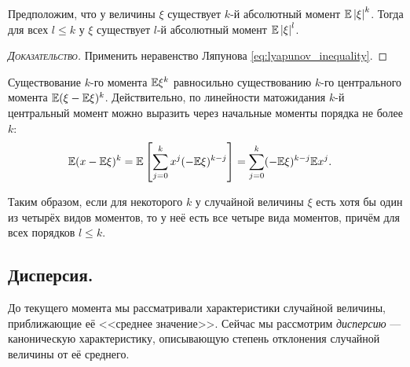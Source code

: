 \documentclass[../main.tex]{subfiles}
\begin{document}
\begin{remrk}
 \label{remark:high_moment_exists_then_low_moment_exists}
 Предположим, что у величины $ \xi $ существует $ k $-й абсолютный момент $ \mathbb E \left| \xi \right|^{k} $. Тогда для всех $ l \leqslant k $ у $ \xi $ существует $ l $-й абсолютный момент $ \mathbb E \left| \xi \right|^{l} $.
\end{remrk}
\begin{proof}[\normalfont\textsc{Доказательство}]
 Применить неравенство Ляпунова \eqref{eq:lyapunov_inequality}.
\end{proof}

\begin{remrk}
 Существование $ k $-го момента $ \mathbb E\xi^{k} $ равносильно существованию $ k $-го центрального момента $ \mathbb E(\xi-\mathbb E\xi)^{k} $. Действительно, по линейности матожидания $ k $-й центральный момент можно выразить через начальные моменты порядка не более $ k $:
 \begin{align*}
  \mathbb E(x-\mathbb E\xi)^{k} &= \mathbb E \left[ \sum_{j=0}^{k} x^{j}(-\mathbb E\xi)^{k-j} \right] = \sum_{j=0}^{k}(-\mathbb E\xi)^{k-j} \mathbb E x^{j}.
 \end{align*}
\end{remrk}

Таким образом, если для некоторого $ k $ у случайной величины $ \xi $ есть хотя бы один из четырёх видов моментов, то у неё есть все четыре вида моментов, причём для всех порядков $ l \leqslant k $.

\subsection{Дисперсия.}

До текущего момента мы рассматривали характеристики случайной величины, приближающие её <<среднее значение>>. Сейчас мы рассмотрим \textit{дисперсию} --- каноническую характеристику, описывающую степень отклонения случайной величины от её среднего.
\end{document}
